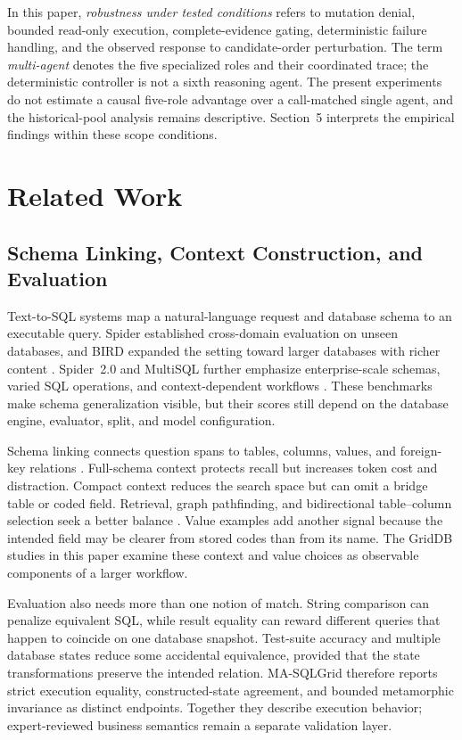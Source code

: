 \documentclass[applsci,article,submit,moreauthors]{Definitions/mdpi}
\newcommand{\masql}{MA-SQLGrid}
\begin{document}
In this paper, \emph{robustness under tested conditions} refers to mutation denial, bounded read-only execution, complete-evidence gating, deterministic failure handling, and the observed response to candidate-order perturbation. The term \emph{multi-agent} denotes the five specialized roles and their coordinated trace; the deterministic controller is not a sixth reasoning agent. The present experiments do not estimate a causal five-role advantage over a call-matched single agent, and the historical-pool analysis remains descriptive. Section~5 interprets the empirical findings within these scope conditions.

\section{Related Work}

\subsection{Schema Linking, Context Construction, and Evaluation}

Text-to-SQL systems map a natural-language request and database schema to an executable query. Spider established cross-domain evaluation on unseen databases, and BIRD expanded the setting toward larger databases with richer content \cite{yu2018spider,li2023bird}. Spider~2.0 and MultiSQL further emphasize enterprise-scale schemas, varied SQL operations, and context-dependent workflows \cite{lei2025spider2,li2024multisql}. These benchmarks make schema generalization visible, but their scores still depend on the database engine, evaluator, split, and model configuration.

Schema linking connects question spans to tables, columns, values, and foreign-key relations \cite{wang2020ratsql,lei2020reexamining,liu2022semantic}. Full-schema context protects recall but increases token cost and distraction. Compact context reduces the search space but can omit a bridge table or coded field. Retrieval, graph pathfinding, and bidirectional table--column selection seek a better balance \cite{bozdemir2026schema,liu2025solidsql,hao2025genlink,wang2025linkalign,safdarian2026schemagraphsql,nahid2026bidirectional}. Value examples add another signal because the intended field may be clearer from stored codes than from its name. The GridDB studies in this paper examine these context and value choices as observable components of a larger workflow.

Evaluation also needs more than one notion of match. String comparison can penalize equivalent SQL, while result equality can reward different queries that happen to coincide on one database snapshot. Test-suite accuracy and multiple database states reduce some accidental equivalence, provided that the state transformations preserve the intended relation. \masql{} therefore reports strict execution equality, constructed-state agreement, and bounded metamorphic invariance as distinct endpoints. Together they describe execution behavior; expert-reviewed business semantics remain a separate validation layer.
\end{document}
